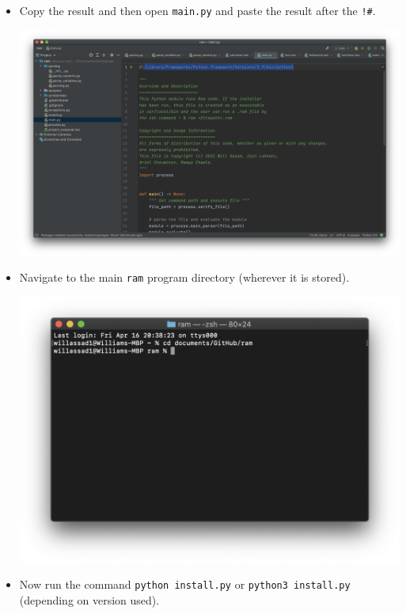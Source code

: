 \documentclass[fontsize=11pt]{article}
\begin{document}
\begin{itemize}
\begin{itemize}
             \item Copy the result and then open \texttt{main.py} and paste the result after the \texttt{!\#}.
             
             \begin{center}
                 \includegraphics[scale=0.2]{terminal4.png}
             \end{center}
            
            \item Navigate to the main \texttt{ram} program directory (wherever it is stored).
            
            \begin{center}
                \includegraphics[scale=0.42]{terminal2.png}
            \end{center}
            
            \item Now run the command \texttt{python install.py} or \texttt{python3 install.py} (depending on version used).
            

\end{itemize}
\end{itemize}
\end{document}
